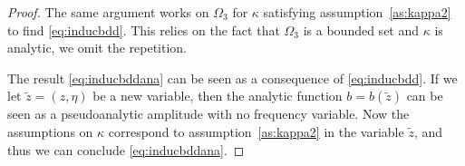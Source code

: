 \documentclass[
	fontsize=11pt, 
	twoside=false, 
	abstract=true, 
	a4paper,
]{scrartcl}
\newcommand{\abs}[1]{\left\lvert#1\right\rvert}
\newcommand{\del}{\partial}
\newcommand{\td}[1]{\tilde{#1}}
\begin{document}
\begin{proof}

	The same argument works on $\Omega_3$ for $\kappa$ satisfying assumption~\ref{as:kappa2} to find \cref{eq:inducbdd}. This relies on the fact that $\Omega_3$ is a bounded set and $\kappa$ is analytic, we omit the repetition.%

	The result \cref{eq:inducbddana} can be seen as a consequence of \cref{eq:inducbdd}. If we let $\td{z} = (z,\eta)$ be a new variable, then the analytic function $b=b(\td{z})$ can be seen as a pseudoanalytic amplitude with no frequency variable. Now the assumptions on $\kappa$ correspond to assumption~\ref{as:kappa2} in the variable $\td{z}$, and thus we can conclude \cref{eq:inducbddana}.
\end{proof}
\end{document}
